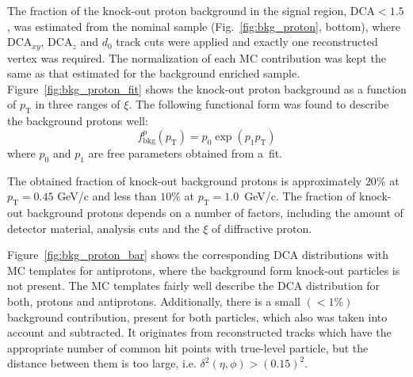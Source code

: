 The fraction of the knock-out proton background in the signal region, $\textrm{DCA}<1.5$, was estimated from the nominal sample (Fig.~\ref{fig:bkg_proton}, bottom), where $\textrm{DCA}_{xy}$, $\textrm{DCA}_z$ and $d_0$ track cuts were applied and exactly one reconstructed vertex was required. The normalization of each MC contribution was kept the same as that estimated for the background enriched sample. Figure~\ref{fig:bkg_proton_fit} shows the knock-out proton background as a function of $p_\textrm{T}$ in three ranges of $\xi$. The following functional form was found to describe the
background protons well:
\begin{equation}
f_{\textrm{bkg}}^{p}\left(p_\textrm{T}\right) = p_0\exp\left(p_1p_\textrm{T}\right)
\label{eq:protonBkgParametrization}
\end{equation}
where  $p_0$ and $p_1$ are  free parameters obtained from a~fit. 

The obtained fraction of knock-out background protons is approximately $20\%$ at $p_\textrm{T} = 0.45$ GeV/c
 and less than $10\%$ at $p_\textrm{T} = 1.0$~GeV/c. The fraction of knock-out background protons depends on a number of factors, including the amount of detector material, analysis cuts and the $\xi$ of diffractive proton. 
 
 
 
 Figure~\ref{fig:bkg_proton_bar} shows the corresponding $\textrm{DCA}$ distributions with MC templates for antiprotons, where the background form knock-out particles is not present. The MC templates  fairly well describe the $\textrm{DCA}$ distribution for both, protons and antiprotons. Additionally, there is a small $\left(<1\%\right)$ background  contribution, present for both particles, which also was taken into account and subtracted. It originates from reconstructed tracks which have the appropriate number of common hit points with true-level particle, but the distance between them is too large, i.e. $\delta^2\left(\eta,\phi\right)>\left(0.15\right)^2$.
 
